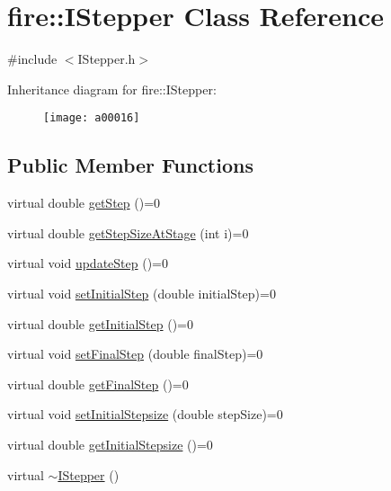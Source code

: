 \hypertarget{a00016}{}\section{fire\+:\+:I\+Stepper Class Reference}
\label{a00016}


{\ttfamily \#include $<$I\+Stepper.\+h$>$}

Inheritance diagram for fire\+:\+:I\+Stepper\+:\begin{figure}[H]
\begin{center}
\leavevmode
\texttt{[image: a00016]}
\end{center}
\end{figure}
\subsection*{Public Member Functions}
\begin{DoxyCompactItemize}
\item 
virtual double \hyperlink{a00016_a7f709d1462a2a3b8bd8214cc681ca26e}{get\+Step} ()=0
\item 
virtual double \hyperlink{a00016_a43027c0c268afcd59db8815c2e2c41ea}{get\+Step\+Size\+At\+Stage} (int i)=0
\item 
virtual void \hyperlink{a00016_a44dfccb90ee5ef6e080b54113c215458}{update\+Step} ()=0
\item 
virtual void \hyperlink{a00016_a3a5099cd0f3c874e56c33cb8f13b8f3b}{set\+Initial\+Step} (double initial\+Step)=0
\item 
virtual double \hyperlink{a00016_a49df3a2ac05cebaf2baf387b66d19272}{get\+Initial\+Step} ()=0
\item 
virtual void \hyperlink{a00016_add76974a7b6fbbc93916270a376c461e}{set\+Final\+Step} (double final\+Step)=0
\item 
virtual double \hyperlink{a00016_ab234d9f032e02668aededf1c22e8c0a9}{get\+Final\+Step} ()=0
\item 
virtual void \hyperlink{a00016_a69c262f248511efcd271be1724a41ad9}{set\+Initial\+Stepsize} (double step\+Size)=0
\item 
virtual double \hyperlink{a00016_afb777e62386b25e5a38d59af54972690}{get\+Initial\+Stepsize} ()=0
\item 
virtual \hyperlink{a00016_ac8ec460d35512e2e039396d5192eb57e}{$\sim$\+I\+Stepper} ()
\end{DoxyCompactItemize}


